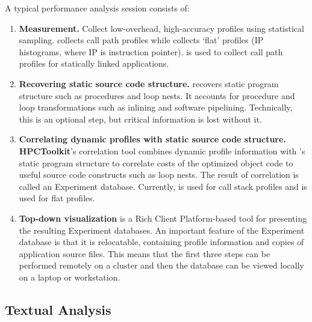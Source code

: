 \documentclass[english]{article}
\begin{document}
A typical performance analysis session consists of:
\begin{enumerate}
\item \textbf{Measurement.}  
Collect low-overhead, high-accuracy profiles using statistical sampling.
 collects call path profiles while  collects `flat' profiles (IP histograms, where IP is instruction pointer).
 is used to collect call path profiles for statically linked applications.

\item \textbf{Recovering static source code structure.} 
 recovers static program structure such as procedures and loop nests.
It accounts for procedure and loop transformations such as inlining and software pipelining.
Technically, this is an optional step, but critical information is lost without it.

\item \textbf{Correlating dynamic profiles with static source code structure.} 
\textbf{HPCToolkit}'s correlation tool combines dynamic profile information with 's static program structure to correlate costs of the optimized object code to useful source code constructs such as loop nests.
The result of correlation is called an Experiment database.
Currently,  is used for call stack profiles and  is used for flat profiles.

\item \textbf{Top-down visualization}
 is a Rich Client Platform-based tool for presenting the resulting Experiment databases.
An important feature of the Experiment database is that it is relocatable, containing profile information and copies of application source files.
This means that the first three steps can be performed remotely on a cluster and then the database can be viewed locally on a laptop or workstation.
\end{enumerate}

\subsection{Textual Analysis}
\end{document}
